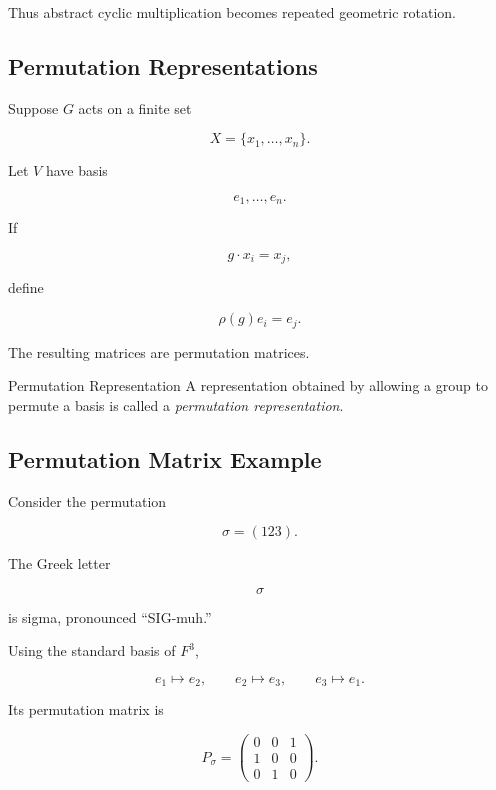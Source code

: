 Thus abstract cyclic multiplication becomes repeated geometric rotation.

\subsection{Permutation Representations}
\label{subsec:permutation-representations}

Suppose \(G\) acts on a finite set

\[ X=\{x_1,\ldots,x_n\}. \]

Let \(V\) have basis

\[ e_1,\ldots,e_n. \]

If

\[ g\cdot x_i=x_j, \]

define

\[ \rho(g)e_i=e_j. \]

The resulting matrices are permutation matrices.

\begin{definitionbox}{Permutation Representation}
A representation obtained by allowing a group to permute a basis is called a
\emph{permutation representation}.
\end{definitionbox}

\subsection{Permutation Matrix Example}
\label{subsec:permutation-matrix-example}

Consider the permutation

\[ \sigma=(123). \]

The Greek letter

\[ \sigma \]

is sigma, pronounced ``SIG-muh.''

Using the standard basis of \(F^3\),

\[ e_1\mapsto e_2,\qquad e_2\mapsto e_3,\qquad e_3\mapsto e_1. \]

Its permutation matrix is

\[ P_\sigma=
\begin{pmatrix}
0&0&1\\
1&0&0\\
0&1&0
\end{pmatrix}. \]

